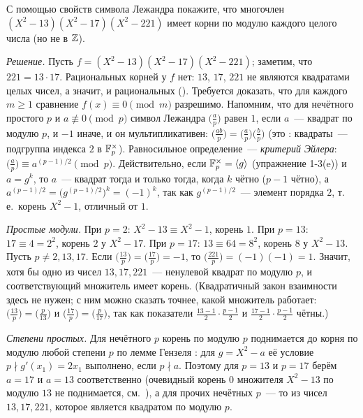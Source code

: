 \begin{exercise}[1-8]
С помощью свойств символа Лежандра покажите, что многочлен $(X^2-13)(X^2-17)(X^2-221)$ имеет корни по модулю
каждого целого числа (но не в $\mathbb Z$).
\end{exercise}

\noindent\emph{Решение.} Пусть $f=(X^2-13)(X^2-17)(X^2-221)$; заметим, что $221=13\cdot17$. Рациональных корней у $f$ нет:
$13$, $17$, $221$ не являются квадратами целых чисел, а значит, и рациональных (). Требуется доказать, что для
каждого $m\ge1$ сравнение $f(x)\equiv0\pmod m$ разрешимо. Напомним, что для нечётного простого $p$ и $a\not\equiv0\pmod p$
символ Лежандра $\bigl(\frac ap\bigr)$ равен $1$, если $a$~--- квадрат по модулю $p$, и $-1$ иначе, и он мультипликативен:
$\bigl(\frac{ab}p\bigr)=\bigl(\frac ap\bigr)\bigl(\frac bp\bigr)$ (это : квадраты~--- подгруппа индекса $2$ в $\mathbb F_p^\times$).
Равносильное определение~--- \emph{критерий Эйлера}: $\bigl(\frac ap\bigr)\equiv a^{(p-1)/2}\pmod p$. Действительно, если
$\mathbb F_p^\times=\langle g\rangle$ (упражнение 1-3(e)) и $a=g^k$, то $a$~--- квадрат тогда и только тогда, когда $k$ чётно
($p-1$ чётно), а $a^{(p-1)/2}=\bigl(g^{(p-1)/2}\bigr)^k=(-1)^k$, так как $g^{(p-1)/2}$~--- элемент порядка $2$, т.\,е.\ корень
$X^2-1$, отличный от $1$.

\emph{Простые модули.} При $p=2$: $X^2-13\equiv X^2-1$, корень $1$. При $p=13$: $17\equiv4=2^2$, корень $2$ у
$X^2-17$. При $p=17$: $13\equiv64=8^2$, корень $8$ у $X^2-13$. Пусть $p\ne2,13,17$. Если $\bigl(\frac{13}p\bigr)=\bigl(\frac{17}p\bigr)=-1$,
то $\bigl(\frac{221}p\bigr)=(-1)(-1)=1$. Значит, хотя бы одно из чисел $13,17,221$~--- ненулевой квадрат по модулю $p$, и
соответствующий множитель имеет корень. (Квадратичный закон взаимности  здесь не нужен; с ним можно
сказать точнее, какой множитель работает: $\bigl(\frac{13}p\bigr)=\bigl(\frac p{13}\bigr)$ и
$\bigl(\frac{17}p\bigr)=\bigl(\frac p{17}\bigr)$, так как показатели $\frac{13-1}2\cdot\frac{p-1}2$ и $\frac{17-1}2\cdot\frac{p-1}2$
чётны.)

\emph{Степени простых.} Для нечётного $p$ корень по модулю $p$ поднимается до корня по модулю любой степени $p$ по
лемме Гензеля : для $g=X^2-a$ её условие $p\nmid g'(x_1)=2x_1$ выполнено, если $p\nmid a$. Поэтому для $p=13$ и
$p=17$ берём $a=17$ и $a=13$ соответственно (очевидный корень $0$ множителя $X^2-13$ по модулю $13$ не поднимается,
см.\ ), а для прочих нечётных $p$~--- то из чисел $13,17,221$, которое является квадратом по модулю $p$.

